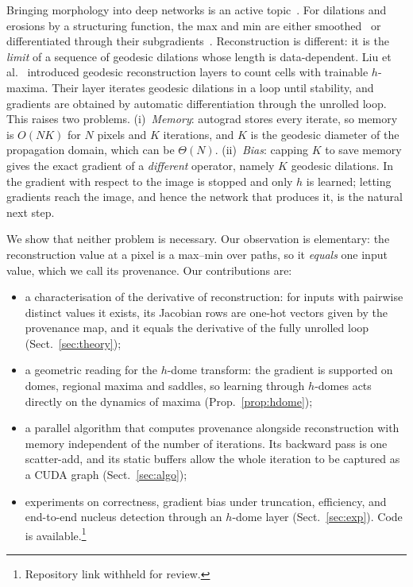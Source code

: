\documentclass[runningheads]{llncs}
\begin{document}
Bringing morphology into deep networks is an active topic~\cite{romerogarcia2026}. For dilations and erosions by a structuring function, the max and min are either smoothed~\cite{masci2013,hermary2022,kirszenberg2021} or differentiated through their subgradients~\cite{franchi2020,blusseau2024,dimitrova2025}. Reconstruction is different: it is the \emph{limit} of a sequence of geodesic dilations whose length is data-dependent. Liu et al.~\cite{liu2024,blusseau2025} introduced geodesic reconstruction layers to count cells with trainable $h$-maxima. Their layer iterates geodesic dilations in a loop until stability, and gradients are obtained by automatic differentiation through the unrolled loop. This raises two problems. (i)~\emph{Memory}: autograd stores every iterate, so memory is $O(NK)$ for $N$ pixels and $K$ iterations, and $K$ is the geodesic diameter of the propagation domain, which can be $\Theta(N)$. (ii)~\emph{Bias}: capping $K$ to save memory gives the exact gradient of a \emph{different} operator, namely $K$ geodesic dilations. In~\cite{blusseau2025} the gradient with respect to the image is stopped and only $h$ is learned; letting gradients reach the image, and hence the network that produces it, is the natural next step.

We show that neither problem is necessary. Our observation is elementary: the reconstruction value at a pixel is a max--min over paths, so it \emph{equals} one input value, which we call its provenance. Our contributions are:
\begin{itemize}
\item a characterisation of the derivative of reconstruction: for inputs with pairwise distinct values it exists, its Jacobian rows are one-hot vectors given by the provenance map, and it equals the derivative of the fully unrolled loop (Sect.~\ref{sec:theory});
\item a geometric reading for the $h$-dome transform: the gradient is supported on domes, regional maxima and saddles, so learning through $h$-domes acts directly on the dynamics of maxima (Prop.~\ref{prop:hdome});
\item a parallel algorithm that computes provenance alongside reconstruction with memory independent of the number of iterations. Its backward pass is one scatter-add, and its static buffers allow the whole iteration to be captured as a CUDA graph (Sect.~\ref{sec:algo});
\item experiments on correctness, gradient bias under truncation, efficiency, and end-to-end nucleus detection through an $h$-dome layer (Sect.~\ref{sec:exp}). Code is available.\footnote{Repository link withheld for review.}
\end{itemize}
\end{document}
